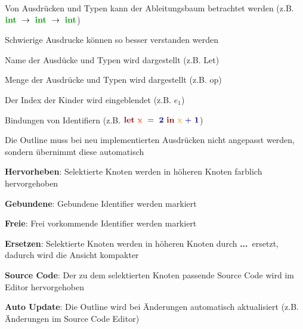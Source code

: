 {
  \begin{itemgroup}{}
    \item Von Ausdrücken und Typen kann der Ableitungsbaum betrachtet werden
          (z.B. $\TypeArrowType{\TypeIntegerType}{\TypeArrowType{\TypeIntegerType}{\TypeIntegerType}}$)
    \item Schwierige Ausdrucke können so besser verstanden werden
    \item Name der Ausdücke und Typen wird dargestellt (z.B. Let)
    \item Menge der Ausdrücke und Typen wird dargestellt (z.B. op)
    \item Der Index der Kinder wird eingeblendet (z.B. $e_1$)
    \item Bindungen von Identifiern (z.B. $\ExprLet{\ExprIdentifierBinding{x}}{}{\ExprConstant{2}}
          {\ExprInfixOperation{\ExprBinaryOperator{+}}{\ExprIdentifierBound{x}}{\ExprConstant{1}}}$)
    \item Die Outline muss bei neu implementierten Ausdrücken nicht angepasst
          werden, sondern übernimmt diese automatisch
  \end{itemgroup}
}

{
  \begin{itemgroup}{}
    \item \textbf{Hervorheben}: Selektierte Knoten werden in höheren Knoten farblich 
                                hervorgehoben
    \item \textbf{Gebundene}: Gebundene Identifier werden markiert
    \item \textbf{Freie}: Frei vorkommende Identifier werden markiert
    \item \textbf{Ersetzen}: Selektierte Knoten werden in höheren Knoten durch
                             \glqq\textbf{...}\grqq\ ersetzt, dadurch wird die Ansicht
                             kompakter
    \item \textbf{Source Code}: Der zu dem selektierten Knoten passende Source Code
                                wird im Editor hervorgehoben
    \item \textbf{Auto Update}: Die Outline wird bei Änderungen automatisch aktualisiert
                                (z.B. Änderungen im Source Code Editor)
  \end{itemgroup}
}

